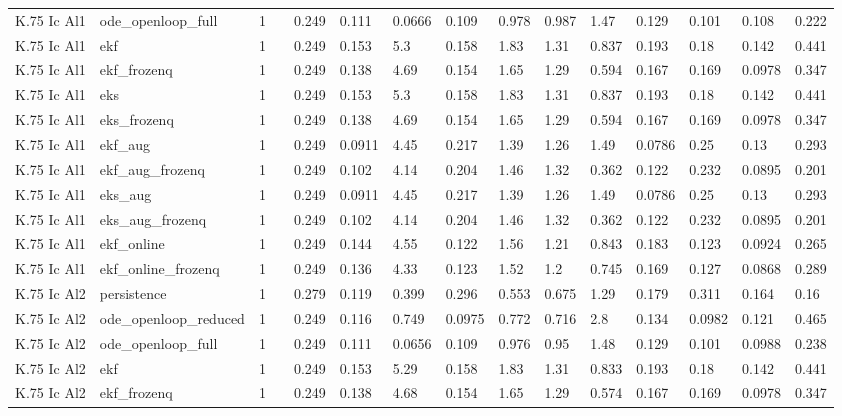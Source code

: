 \begin{table}[t]
\begin{tabular}{lllllllllllllll}
K.75 Ic Al1 & ode\_openloop\_full & 1 &  & 0.249 & 0.111 & 0.0666 & 0.109 & 0.978 & 0.987 & 1.47 & 0.129 & 0.101 & 0.108 & 0.222 \\
K.75 Ic Al1 & ekf & 1 &  & 0.249 & 0.153 & 5.3 & 0.158 & 1.83 & 1.31 & 0.837 & 0.193 & 0.18 & 0.142 & 0.441 \\
K.75 Ic Al1 & ekf\_frozenq & 1 &  & 0.249 & 0.138 & 4.69 & 0.154 & 1.65 & 1.29 & 0.594 & 0.167 & 0.169 & 0.0978 & 0.347 \\
K.75 Ic Al1 & eks & 1 &  & 0.249 & 0.153 & 5.3 & 0.158 & 1.83 & 1.31 & 0.837 & 0.193 & 0.18 & 0.142 & 0.441 \\
K.75 Ic Al1 & eks\_frozenq & 1 &  & 0.249 & 0.138 & 4.69 & 0.154 & 1.65 & 1.29 & 0.594 & 0.167 & 0.169 & 0.0978 & 0.347 \\
K.75 Ic Al1 & ekf\_aug & 1 &  & 0.249 & 0.0911 & 4.45 & 0.217 & 1.39 & 1.26 & 1.49 & 0.0786 & 0.25 & 0.13 & 0.293 \\
K.75 Ic Al1 & ekf\_aug\_frozenq & 1 &  & 0.249 & 0.102 & 4.14 & 0.204 & 1.46 & 1.32 & 0.362 & 0.122 & 0.232 & 0.0895 & 0.201 \\
K.75 Ic Al1 & eks\_aug & 1 &  & 0.249 & 0.0911 & 4.45 & 0.217 & 1.39 & 1.26 & 1.49 & 0.0786 & 0.25 & 0.13 & 0.293 \\
K.75 Ic Al1 & eks\_aug\_frozenq & 1 &  & 0.249 & 0.102 & 4.14 & 0.204 & 1.46 & 1.32 & 0.362 & 0.122 & 0.232 & 0.0895 & 0.201 \\
K.75 Ic Al1 & ekf\_online & 1 &  & 0.249 & 0.144 & 4.55 & 0.122 & 1.56 & 1.21 & 0.843 & 0.183 & 0.123 & 0.0924 & 0.265 \\
K.75 Ic Al1 & ekf\_online\_frozenq & 1 &  & 0.249 & 0.136 & 4.33 & 0.123 & 1.52 & 1.2 & 0.745 & 0.169 & 0.127 & 0.0868 & 0.289 \\
K.75 Ic Al2 & persistence & 1 &  & 0.279 & 0.119 & 0.399 & 0.296 & 0.553 & 0.675 & 1.29 & 0.179 & 0.311 & 0.164 & 0.16 \\
K.75 Ic Al2 & ode\_openloop\_reduced & 1 &  & 0.249 & 0.116 & 0.749 & 0.0975 & 0.772 & 0.716 & 2.8 & 0.134 & 0.0982 & 0.121 & 0.465 \\
K.75 Ic Al2 & ode\_openloop\_full & 1 &  & 0.249 & 0.111 & 0.0656 & 0.109 & 0.976 & 0.95 & 1.48 & 0.129 & 0.101 & 0.0988 & 0.238 \\
K.75 Ic Al2 & ekf & 1 &  & 0.249 & 0.153 & 5.29 & 0.158 & 1.83 & 1.31 & 0.833 & 0.193 & 0.18 & 0.142 & 0.441 \\
K.75 Ic Al2 & ekf\_frozenq & 1 &  & 0.249 & 0.138 & 4.68 & 0.154 & 1.65 & 1.29 & 0.574 & 0.167 & 0.169 & 0.0978 & 0.347 \\

\end{tabular}
\end{table}
